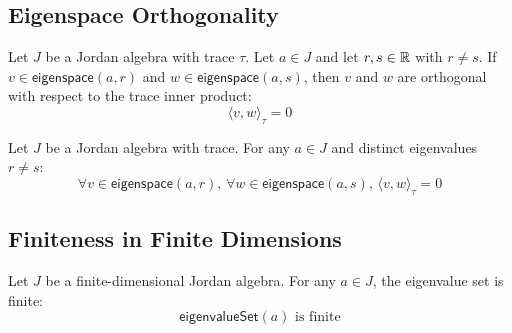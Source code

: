 \subsection{Eigenspace Orthogonality}

\begin{theorem}
Let $J$ be a Jordan algebra with trace $\tau$. Let $a \in J$ and let $r, s \in \mathbb{R}$ with $r \ne s$. If $v \in \mathsf{eigenspace}(a, r)$ and $w \in \mathsf{eigenspace}(a, s)$, then $v$ and $w$ are orthogonal with respect to the trace inner product:
\[ \langle v, w \rangle_\tau = 0 \]
\end{theorem}

\begin{corollary}
Let $J$ be a Jordan algebra with trace. For any $a \in J$ and distinct eigenvalues $r \ne s$:
\[ \forall v \in \mathsf{eigenspace}(a, r),\, \forall w \in \mathsf{eigenspace}(a, s),\, \langle v, w \rangle_\tau = 0 \]
\end{corollary}

\subsection{Finiteness in Finite Dimensions}

\begin{theorem}
Let $J$ be a finite-dimensional Jordan algebra. For any $a \in J$, the eigenvalue set is finite:
\[ \mathsf{eigenvalueSet}(a) \text{ is finite} \]
\end{theorem}
